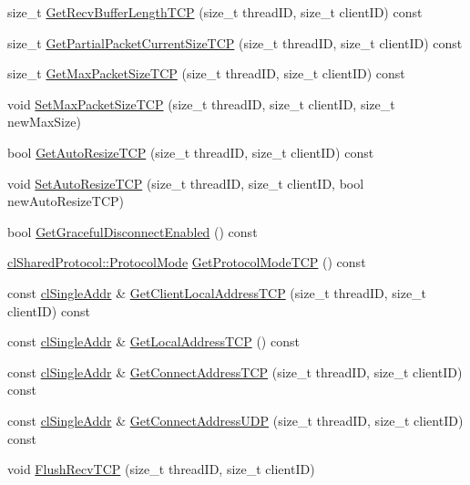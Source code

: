 \begin{DoxyCompactItemize}
\item 
size\_\-t \hyperlink{classcl_server_state_a25076fc19a70980db2d575a0e0d4fb8c}{GetRecvBufferLengthTCP} (size\_\-t threadID, size\_\-t clientID) const 
\item 
size\_\-t \hyperlink{classcl_server_state_a657be97242d234350f5d5193bf1323fd}{GetPartialPacketCurrentSizeTCP} (size\_\-t threadID, size\_\-t clientID) const 
\item 
size\_\-t \hyperlink{classcl_server_state_ae65f7e9ed108d2ceee3e803be4663e21}{GetMaxPacketSizeTCP} (size\_\-t threadID, size\_\-t clientID) const 
\item 
void \hyperlink{classcl_server_state_a69575a84cd634b4105187cb1644a9fe9}{SetMaxPacketSizeTCP} (size\_\-t threadID, size\_\-t clientID, size\_\-t newMaxSize)
\item 
bool \hyperlink{classcl_server_state_a40e9658d157664d28b4ff6764653ee52}{GetAutoResizeTCP} (size\_\-t threadID, size\_\-t clientID) const 
\item 
void \hyperlink{classcl_server_state_aa324f4af4421895f4c06fed536826d40}{SetAutoResizeTCP} (size\_\-t threadID, size\_\-t clientID, bool newAutoResizeTCP)
\item 
bool \hyperlink{classcl_server_state_a3458bc8c0e335c67243fe5f4225bc5e5}{GetGracefulDisconnectEnabled} () const 
\item 
\hyperlink{classcl_shared_protocol_a4b0b9c82b8ae4eee78c6308c35afd47b}{clSharedProtocol::ProtocolMode} \hyperlink{classcl_server_state_aaedff3aeda921ce765c0d92a116d34b3}{GetProtocolModeTCP} () const 
\item 
const \hyperlink{classcl_single_addr}{clSingleAddr} \& \hyperlink{classcl_server_state_a417e525b8f5cd73c2051bf32040334cc}{GetClientLocalAddressTCP} (size\_\-t threadID, size\_\-t clientID) const 
\item 
const \hyperlink{classcl_single_addr}{clSingleAddr} \& \hyperlink{classcl_server_state_a43b1ac7de146c88e64bfeacb277a2b8f}{GetLocalAddressTCP} () const 
\item 
const \hyperlink{classcl_single_addr}{clSingleAddr} \& \hyperlink{classcl_server_state_ac464bdb2b462528f5e08d8d044e052d5}{GetConnectAddressTCP} (size\_\-t threadID, size\_\-t clientID) const 
\item 
const \hyperlink{classcl_single_addr}{clSingleAddr} \& \hyperlink{classcl_server_state_ab76e0a98a18b26f5c9c90a2c30127228}{GetConnectAddressUDP} (size\_\-t threadID, size\_\-t clientID) const 
\item 
void \hyperlink{classcl_server_state_ac139ec3acb06e1b28744339cbb9710d6}{FlushRecvTCP} (size\_\-t threadID, size\_\-t clientID)

\end{DoxyCompactItemize}
